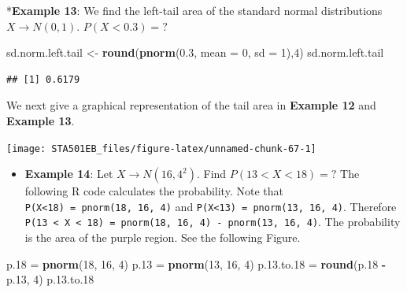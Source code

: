 \documentclass[
]{book}
\newenvironment{Shaded}{\begin{snugshade}}{\end{snugshade}}
\newcommand{\AttributeTok}[1]{\textcolor[rgb]{0.13,0.29,0.53}{#1}}
\newcommand{\DecValTok}[1]{\textcolor[rgb]{0.00,0.00,0.81}{#1}}
\newcommand{\FloatTok}[1]{\textcolor[rgb]{0.00,0.00,0.81}{#1}}
\newcommand{\FunctionTok}[1]{\textcolor[rgb]{0.13,0.29,0.53}{\textbf{#1}}}
\newcommand{\NormalTok}[1]{#1}
\newcommand{\OtherTok}[1]{\textcolor[rgb]{0.56,0.35,0.01}{#1}}
\newcommand{\SpecialCharTok}[1]{\textcolor[rgb]{0.81,0.36,0.00}{\textbf{#1}}}
\providecommand{\tightlist}{%
  \setlength{\itemsep}{0pt}\setlength{\parskip}{0pt}}
\begin{document}
*\textbf{Example 13}: We find the left-tail area of the standard normal distributions \(X \to N(0, 1)\). \(P(X < 0.3) = ?\)

\begin{Shaded}
\begin{Highlighting}[]
\NormalTok{sd.norm.left.tail }\OtherTok{\textless{}{-}} \FunctionTok{round}\NormalTok{(}\FunctionTok{pnorm}\NormalTok{(}\FloatTok{0.3}\NormalTok{, }\AttributeTok{mean =} \DecValTok{0}\NormalTok{, }\AttributeTok{sd =} \DecValTok{1}\NormalTok{),}\DecValTok{4}\NormalTok{)}
\NormalTok{sd.norm.left.tail}
\end{Highlighting}
\end{Shaded}

\begin{verbatim}
## [1] 0.6179
\end{verbatim}

We next give a graphical representation of the tail area in \textbf{Example 12} and \textbf{Example 13}.

\begin{center}\texttt{[image: STA501EB\_files/figure-latex/unnamed-chunk-67-1]} \end{center}

\begin{itemize}
\tightlist
\item
  \textbf{Example 14}: Let \(X \to N(16, 4^2)\). Find \(P(13 < X <18) = ?\)
  The following R code calculates the probability. Note that \texttt{P(X\textless{}18)\ =\ pnorm(18,\ 16,\ 4)} and \texttt{P(X\textless{}13)\ =\ pnorm(13,\ 16,\ 4)}. Therefore \texttt{P(13\ \textless{}\ X\ \textless{}\ 18)\ =\ pnorm(18,\ 16,\ 4)\ -\ pnorm(13,\ 16,\ 4)}. The probability is the area of the purple region. See the following Figure.
\end{itemize}

\begin{Shaded}
\begin{Highlighting}[]
\NormalTok{p}\FloatTok{.18} \OtherTok{=} \FunctionTok{pnorm}\NormalTok{(}\DecValTok{18}\NormalTok{, }\DecValTok{16}\NormalTok{, }\DecValTok{4}\NormalTok{)}
\NormalTok{p}\FloatTok{.13} \OtherTok{=} \FunctionTok{pnorm}\NormalTok{(}\DecValTok{13}\NormalTok{, }\DecValTok{16}\NormalTok{, }\DecValTok{4}\NormalTok{)}
\NormalTok{p.}\FloatTok{13.}\NormalTok{to}\FloatTok{.18} \OtherTok{=} \FunctionTok{round}\NormalTok{(p}\FloatTok{.18} \SpecialCharTok{{-}}\NormalTok{ p}\FloatTok{.13}\NormalTok{, }\DecValTok{4}\NormalTok{)}
\NormalTok{p.}\FloatTok{13.}\NormalTok{to}\FloatTok{.18}
\end{Highlighting}
\end{Shaded}
\end{document}
